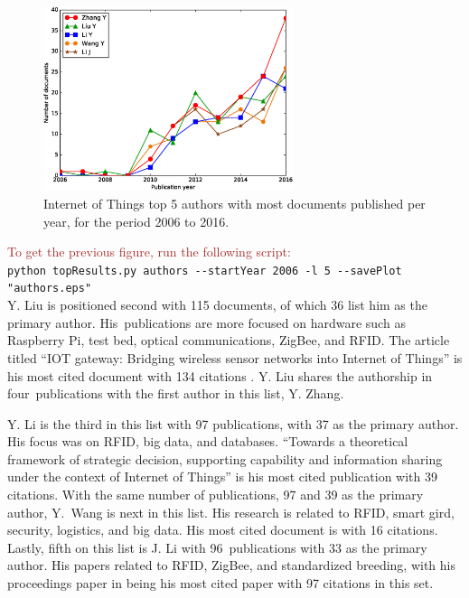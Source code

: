 \documentclass[symmetry,article,accept,moreauthors,pdftex10pt,a4paper]{mdpi}
\newcommand{\figuresWidth}{0.65\textwidth}
\begin{document}
\begin{figure}[H]
	\centering
	\includegraphics[width=\figuresWidth]{./graphs/figure3.eps}
	\caption{Internet of Things top 5 authors with most documents published per year, for the period 2006 to 2016.}
	\label{fig_authors}
\end{figure}  

\noindent
\textcolor{brown}{To get the previous figure, run the following script:}\\
\hspace*{0.5cm}\verb|python topResults.py authors --startYear 2006 -l 5 --savePlot "authors.eps"|\\


Y. Liu is positioned second with 115 documents, of which 36 list him as the primary author. His~publications are more focused on hardware such as Raspberry Pi, test bed, optical communications, ZigBee, and RFID. The article titled ``IOT gateway: Bridging wireless sensor networks into Internet of Things'' is his most cited document with 134 citations \cite{Zhu2010347}. Y. Liu shares the authorship in four~publications with the first author in this list, Y. Zhang.

Y. Li is the third in this list with 97 publications, with 37 as the primary author. His  focus was on RFID, big data, and databases. ``Towards a theoretical framework of strategic decision, supporting capability and information sharing under the context of Internet of Things'' \cite{Li2012} is his most cited publication with 39 citations. With the same number of publications, 97 and 39 as the primary author, Y.~Wang is next in this list. His research is related to RFID, smart gird, security, logistics, and big data. His most cited document is \cite{6737280} with 16 citations. Lastly, fifth on this list is J. Li with 96~publications with 33 as the primary author. His papers related to RFID, ZigBee, and standardized breeding, with his proceedings paper in \cite{Su20111028} being his most cited paper with 97 citations in this set.  %
\end{document}
